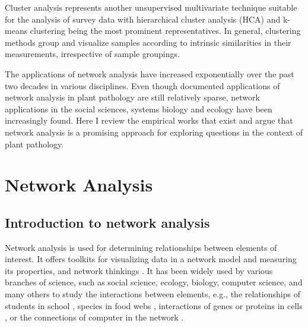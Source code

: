 Cluster analysis represents another unsupervised multivariate technique suitable for the analysis of survey data with hierarchical cluster analysis (HCA) and k-means clustering  being the most prominent representatives. In general, clustering methods group and visualize samples according to intrinsic similarities in their measurements, irrespective of sample groupings. 

\newpage

The applications of network analysis have increased exponentially over the past two decades in various disciplines. Even though documented applications of network analysis in plant pathology are still relatively sparse, network applications in the social sciences, systems biology and ecology have been increasingly found. Here I review the empirical works that exist and argue that network analysis is a promising approach for exploring questions in the context of plant pathology.





\section*{Network Analysis}
\subsection*{Introduction to network analysis}
Network analysis is used for determining relationships between elements of interest. It offers toolkits for visualizing data in a network model and measuring its properties, and network thinkings \citep{PROULX:2005hx}. It has been widely used by various branches of science, such as social science, ecology, biology, computer science, and many others to study the interactions between elements, e.g., the relationships of students in school \citep{moody2001race}, species in food webs \citep{krause2003compartments}, interactions of genes or proteins in cells \citep{guimera2005functional}, or the connections of computer in the network \citep{pastor2001epidemic, newman2006modularity}.

